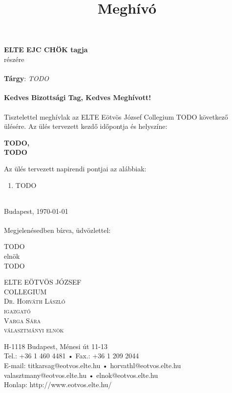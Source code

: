 \documentclass[12pt,a4paper]{article}
\title{Meghívó\vspace{-1.0cm}}
\date{}
\author{}
\makeatletter
\newcommand\Footer{

	{\footnotesize 
	\begin{minipage}[t]{0.4\textwidth}
		\begin{flushright}
		\textsc{
            {\color{darkblue} 
			ELTE EÖTVÖS JÓZSEF\\
			COLLEGIUM}\\
		    {\scriptsize 
		    Dr. Horváth László\\
			igazgató\\
			Varga Sára\\
			választmányi elnök\\
            }
            }
		\end{flushright}
	\end{minipage}
	\hspace{1em}
	\begin{minipage}[t]{0.45\textwidth}
		\begin{flushleft}
			{\scriptsize H-1118 Budapest, Ménesi út 11-13\\
			Tel.: +36 1 460 4481 • Fax.: +36 1 209 2044\\
			E-mail:	titkarsag@eotvos.elte.hu • horvathl@eotvos.elte.hu
			valasztmany@eotvos.elte.hu • elnok@eotvos.elte.hu\\
			Honlap: http://www.eotvos.elte.hu/ }
		\end{flushleft}
	\end{minipage}
	}
}
\newcommand{\signiture}[3]{
\begin{center}
	#1\\
	#2\\
	#3
\end{center}
}
\makeatother
\begin{document}
\vspace*{0.5cm}
\textbf{ELTE EJC CHÖK tagja}\\
részére\\
\\
\textbf{Tárgy}: \emph{TODO}\\ 
\\
\textbf{Kedves Bizottsági Tag, Kedves Meghívott!}\\
\\
Tisztelettel meghívlak az ELTE Eötvös József Collegium TODO következő
ülésére. Az ülés tervezett kezdő időpontja és helyszíne:

\begin{center}
\textbf{
TODO,\\
TODO
}
\end{center}

Az ülés tervezett napirendi pontjai az alábbiak:

\begin{enumerate}
    \item TODO
\end{enumerate}

\leavevmode\\
Budapest, \today \\
\\
Megjelenésedben bízva, üdvözlettel:
\vspace{5em}

\begin{flushright}
\begin{minipage}[t]{0.4\textwidth}
	\signiture{TODO}{elnök}{TODO}
\end{minipage}
\end{flushright}

\vfill

\begin{center}
	\Footer
\end{center}
\end{document}

